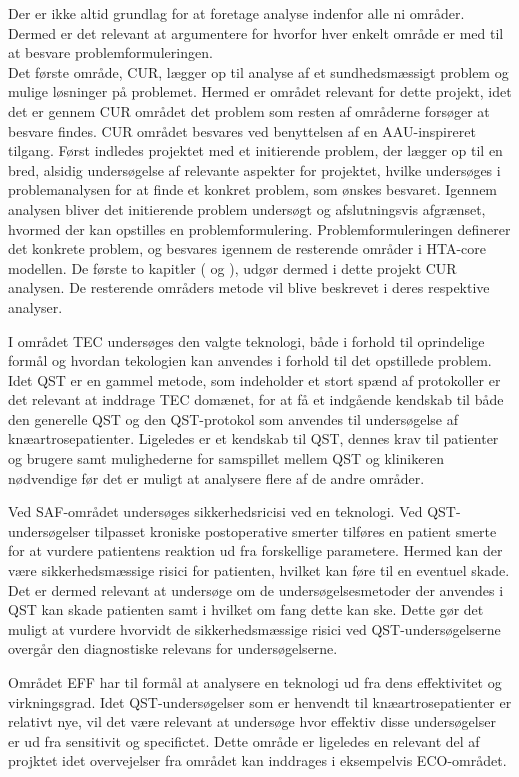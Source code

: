 Der er ikke altid grundlag for at foretage analyse indenfor alle ni områder. \citep{HTAcore} Dermed er det relevant at argumentere for hvorfor hver enkelt område er med til at besvare problemformuleringen. \\
Det første område, CUR, lægger op til analyse af et sundhedsmæssigt problem og mulige løsninger på problemet. Hermed er området relevant for dette projekt, idet det er gennem CUR området det problem som resten af områderne forsøger at besvare findes. CUR området besvares ved benyttelsen af en AAU-inspireret tilgang. Først indledes projektet med et initierende problem, der lægger op til en bred, alsidig undersøgelse af relevante aspekter for projektet, hvilke undersøges i problemanalysen for at finde et konkret problem, som ønskes besvaret. Igennem analysen bliver det initierende problem undersøgt og afslutningsvis afgrænset, hvormed der kan opstilles en problemformulering. Problemformuleringen definerer det konkrete problem, og besvares igennem de resterende områder i HTA-core modellen. De første to kapitler ( og ), udgør dermed i dette projekt CUR analysen. De resterende områders metode vil blive beskrevet i deres respektive analyser. 

I området TEC undersøges den valgte teknologi, både i forhold til oprindelige formål og hvordan tekologien kan anvendes i forhold til det opstillede problem. Idet QST er en gammel metode, som indeholder et stort spænd af protokoller er det relevant at inddrage TEC domænet, for at få et indgående kendskab til både den generelle QST og den QST-protokol som anvendes til undersøgelse af knæartrosepatienter. Ligeledes er et kendskab til QST, dennes krav til patienter og brugere samt mulighederne for samspillet mellem QST og klinikeren nødvendige før det er muligt at analysere flere af de andre områder. 

Ved SAF-området undersøges sikkerhedsricisi ved en teknologi. Ved QST-undersøgelser tilpasset kroniske postoperative smerter tilføres en patient smerte for at vurdere patientens reaktion ud fra forskellige parametere. Hermed kan der være sikkerhedsmæssige risici for patienten, hvilket kan føre til en eventuel skade. Det er dermed relevant at undersøge om de undersøgelsesmetoder der anvendes i QST kan skade patienten samt i hvilket om fang dette kan ske. Dette gør det muligt at vurdere hvorvidt de sikkerhedsmæssige risici ved QST-undersøgelserne overgår den diagnostiske relevans for undersøgelserne. 

Området EFF har til formål at analysere en teknologi ud fra dens effektivitet og virkningsgrad. Idet QST-undersøgelser som er henvendt til knæartrosepatienter er relativt nye, vil det være relevant at undersøge hvor effektiv disse undersøgelser er ud fra sensitivit og specifictet. Dette område er ligeledes en relevant del af projktet idet overvejelser fra området kan inddrages i eksempelvis ECO-området.   

